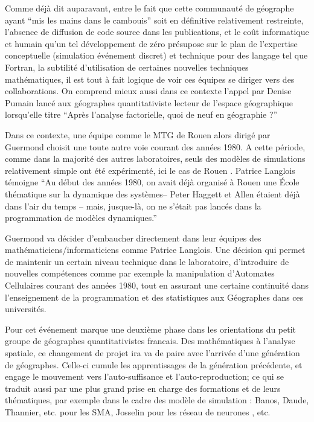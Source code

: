 Comme déjà dit auparavant, entre le fait que cette communauté de géographe ayant \enquote{mis les mains dans le cambouis} soit en définitive relativement restreinte, l'absence de diffusion de code source dans les publications, et le coût informatique et humain qu'un tel développement de zéro présupose sur le plan de l'expertise conceptuelle (simulation événement discret) et technique pour des langage tel que Fortran, la subtilité d'utilisation de certaines nouvelles techniques mathématiques, il est tout à fait logique de voir ces équipes se diriger vers des collaborations. On comprend mieux aussi dans ce contexte l'appel par Denise Pumain lancé aux géographes quantitativiste lecteur de l'espace géographique lorsqu'elle titre  \enquote{Après l'analyse factorielle, quoi de neuf en géographie ?} \autocite{Pumain1984}

Dans ce contexte, une équipe comme le MTG de Rouen alors dirigé par Guermond choisit une toute autre voie courant des années 1980. A cette période, comme dans la majorité des autres laboratoires, seuls des modèles de simulations relativement simple ont été expérimenté, ici le cas de Rouen \autocite{Guermond1983}. Patrice Langlois témoigne \enquote{Au début des années 1980, on avait déjà organisé à Rouen une École thématique sur la dynamique des systèmes– Peter Haggett et Allen étaient déjà dans l’air du temps – mais, jusque-là, on ne s’était pas lancés dans la programmation de modèles dynamiques.} \autocite{Mathieu2014} 

Guermond va décider d'embaucher directement dans leur équipes des mathématiciens/informaticiens comme Patrice Langlois. Une décision qui permet de maintenir un certain niveau technique dans le laboratoire, d’introduire de nouvelles compétences comme par exemple la manipulation d'Automates Cellulaires courant des années 1980, tout en assurant une certaine continuité dans l’enseignement de la programmation et des statistiques aux Géographes dans ces universités. 

Pour \autocite[320-321]{Cuyala2014} cet événement marque une deuxième phase dans les orientations du petit groupe de géographes quantitativistes francais. Des mathématiques à l'analyse spatiale, ce changement de projet ira va de paire avec l'arrivée d'une génération de géographes. Celle-ci cumule les apprentissages de la génération précédente, et engage le mouvement vers l'auto-suffisance et l'auto-reproduction; ce qui se traduit aussi par une plus grand prise en charge des formations et de leurs thématiques, par exemple dans le cadre des modèle de simulation : Banos, Daude, Thannier, etc. pour les SMA, Josselin pour les réseau de neurones \autocite{Dumolard1994}, etc.

